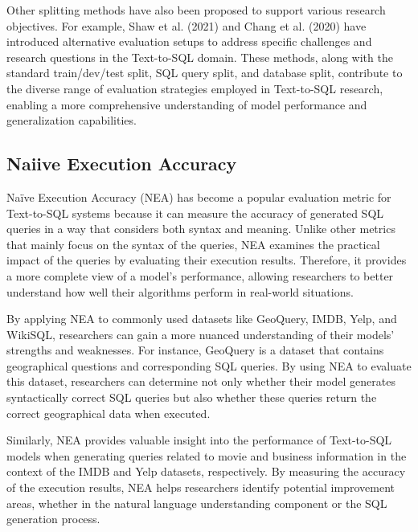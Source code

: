 Other splitting methods have also been proposed to support various research objectives. For example, Shaw et al. (2021) and Chang et al. (2020) have introduced alternative evaluation setups to address specific challenges and research questions in the Text-to-SQL domain. These methods, along with the standard train/dev/test split, SQL query split, and database split, contribute to the diverse range of evaluation strategies employed in Text-to-SQL research, enabling a more comprehensive understanding of model performance and generalization capabilities.



\subsection{Naiive Execution Accuracy}

Naïve Execution Accuracy (NEA) has become a popular evaluation metric for Text-to-SQL systems because it can measure the accuracy of generated SQL queries in a way that considers both syntax and meaning. Unlike other metrics that mainly focus on the syntax of the queries, NEA examines the practical impact of the queries by evaluating their execution results. Therefore, it provides a more complete view of a model's performance, allowing researchers to better understand how well their algorithms perform in real-world situations.

By applying NEA to commonly used datasets like GeoQuery, IMDB, Yelp, and WikiSQL, researchers can gain a more nuanced understanding of their models' strengths and weaknesses. For instance, GeoQuery is a dataset that contains geographical questions and corresponding SQL queries. By using NEA to evaluate this dataset, researchers can determine not only whether their model generates syntactically correct SQL queries but also whether these queries return the correct geographical data when executed.

Similarly, NEA provides valuable insight into the performance of Text-to-SQL models when generating queries related to movie and business information in the context of the IMDB and Yelp datasets, respectively. By measuring the accuracy of the execution results, NEA helps researchers identify potential improvement areas, whether in the natural language understanding component or the SQL generation process.

